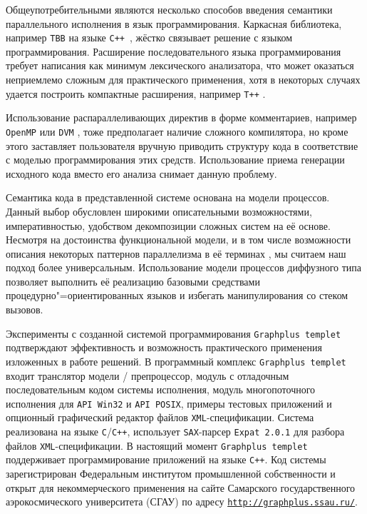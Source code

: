 Общеупотребительными являются несколько способов введения семантики параллельного исполнения в язык программирования. Каркасная библиотека, например {\tt TBB} на языке {\tt С++}~\cite{vkl:bib:bib11}, жёстко связывает решение с языком программирования. Расширение последовательного языка программирования требует написания как минимум лексического анализатора, что может оказаться неприемлемо сложным для практического применения, хотя в некоторых случаях удается построить компактные расширения, например {\tt T++} \cite{vkl:bib:bib12}. 

Использование распараллеливающих директив в форме комментариев, например {\tt OpenMP} \cite{vkl:bib:bib13} или {\tt DVM} \cite{vkl:bib:bib14}, тоже предполагает наличие сложного компилятора, но кроме этого заставляет пользователя вручную приводить структуру кода в соответствие с моделью программирования этих средств. Использование приема генерации исходного кода вместо его анализа снимает данную проблему.



Семантика кода в представленной системе основана на модели процессов. Данный выбор обусловлен широкими описательными возможностями, императивностью, удобством декомпозиции сложных систем на её основе. Несмотря на достоинства функциональной модели, и в том числе возможности описания некоторых паттернов параллелизма в её терминах \cite{vkl:bib:bib15}, мы считаем наш подход более универсальным. Использование модели процессов диффузного типа \cite{vkl:bib:bib16} позволяет выполнить её реализацию базовыми средствами процедурно"=ориентированных языков и избегать манипулирования со стеком вызовов.



Эксперименты с созданной системой программирования {\tt Graphplus temp\-let} подтверждают эффективность и возможность практического применения изложенных в работе решений. В программный комплекс {\tt Graphplus templet} входит транслятор модели / препроцессор, модуль с отладочным последовательным кодом системы исполнения, модуль многопоточного исполнения для {\tt API Win32} и {\tt API POSIX}, примеры тестовых приложений и опционный графический редактор файлов {\tt XML}-спецификации. Система реализована на языке {\tt C}/{\tt C++}, использует {\tt SAX}-парсер {\tt Expat 2.0.1} для разбора файлов {\tt XML}-спецификации. В настоящий момент  {\tt Graphplus templet} поддерживает программирование приложений на языке {\tt C++}. Код системы зарегистрирован Федеральным институтом промышленной собственности и открыт для некоммерческого применения на сайте Самарского государственного аэрокосмического университета (СГАУ) по адресу \href{http://graphplus.ssau.ru}{\tt \small http://graphplus.ssau.ru/}. 


